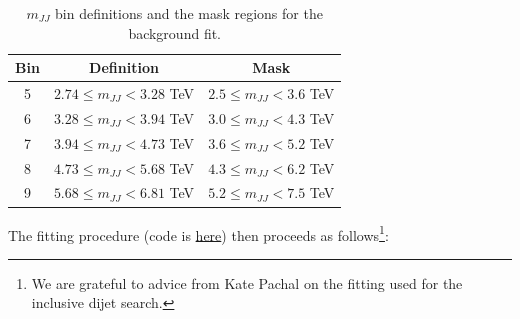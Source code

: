 \begin{table}[htb]
  \centering
  \caption{\label{tab:mjj_bins2} $m_{JJ}$ bin definitions and the mask regions for the background fit.}
  \begin{tabular}{c c c}
    \hline
    Bin & Definition & Mask  \\ \hline
    5 & $2.74 \le m_{JJ} < 3.28$ TeV & $2.5 \le m_{JJ} < 3.6$ TeV \\
    6 & $3.28 \le m_{JJ} < 3.94$ TeV & $3.0 \le m_{JJ} < 4.3$ TeV \\
    7 & $3.94 \le m_{JJ} < 4.73$ TeV & $3.6 \le m_{JJ} < 5.2$ TeV \\
    8 & $4.73 \le m_{JJ} < 5.68$ TeV & $4.3 \le m_{JJ} < 6.2$ TeV \\
    9 & $5.68 \le m_{JJ} < 6.81$ TeV & $5.2 \le m_{JJ} < 7.5$ TeV \\
    \hline
  \end{tabular}
\end{table} 

The fitting procedure (code is \href{https://gitlab.cern.ch/cwola-hunting/fitting/tree/minimal}{here}) then proceeds as follows\footnote{We are grateful to advice from Kate Pachal on the fitting used for the inclusive dijet search.}:

